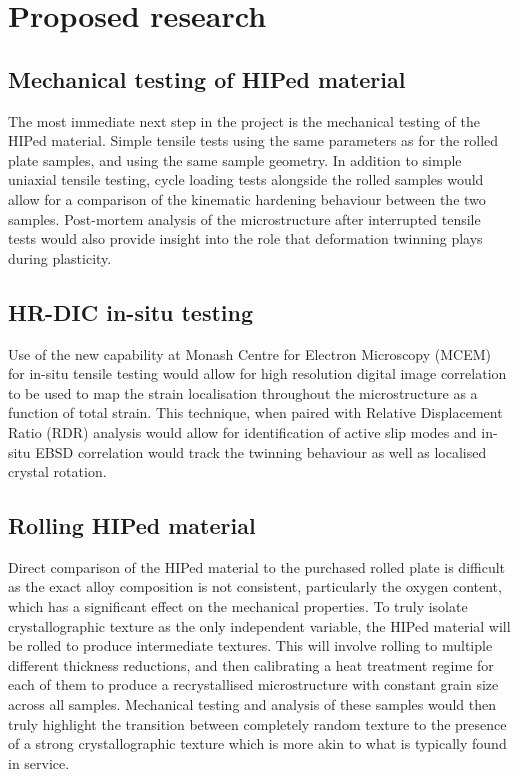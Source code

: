 \chapter{Proposed research}

\section{Mechanical testing of HIPed material}
The most immediate next step in the project is the mechanical testing of the HIPed material.
Simple tensile tests using the same parameters as for the rolled plate samples, and using the same sample geometry.
In addition to simple uniaxial tensile testing, cycle loading tests alongside the rolled samples would allow for a comparison of the kinematic hardening behaviour between the two samples.
Post-mortem analysis of the microstructure after interrupted tensile tests would also provide insight into the role that deformation twinning plays during plasticity.

\section{HR-DIC in-situ testing}
Use of the new capability at Monash Centre for Electron Microscopy (MCEM) for in-situ tensile testing would allow for high resolution digital image correlation to be used to map the strain localisation throughout the microstructure as a function of total strain.
This technique, when paired with Relative Displacement Ratio (RDR) analysis would allow for identification of active slip modes and in-situ EBSD correlation would track the twinning behaviour as well as localised crystal rotation.

\section{Rolling HIPed material}
Direct comparison of the HIPed material to the purchased rolled plate is difficult as the exact alloy composition is not consistent, particularly the oxygen content, which has a significant effect on the mechanical properties.
To truly isolate crystallographic texture as the only independent variable, the HIPed material will be rolled to produce intermediate textures.
This will involve rolling to multiple different thickness reductions, and then calibrating a heat treatment regime for each of them to produce a recrystallised microstructure with constant grain size across all samples.
Mechanical testing and analysis of these samples would then truly highlight the transition between completely random texture to the presence of a strong crystallographic texture which is more akin to what is typically found in service.

